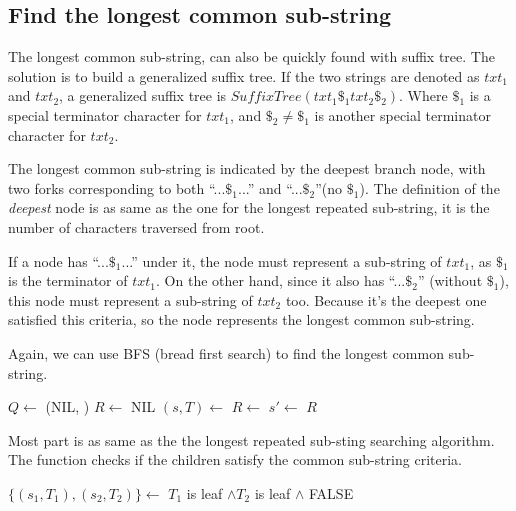 \documentclass{article}
\begin{document}
\subsection{Find the longest common sub-string}

The longest common sub-string, can also be quickly found
with suffix tree. The solution is to build a generalized suffix
tree. If the two strings are denoted as $txt_1$ and
$txt_2$, a generalized suffix tree is $SuffixTree(txt_1\$_1txt_2\$_2)$.
Where $\$_1$ is a special terminator character for $txt_1$, and
$\$_2 \neq \$_1$ is another special terminator character for $txt_2$.

The longest common sub-string is indicated by the deepest branch node, with
two forks corresponding to both ``...$\$_1$...'' and ``...$\$_2$''(no $\$_1$).
The definition of the {\em deepest} node is as same as the one for
the longest repeated sub-string, it is the number of characters traversed
from root.

If a node has ``...$\$_1$...'' under it, the node must represent
a sub-string of $txt_1$, as $\$_1$ is the terminator of $txt_1$.
On the other hand, since it also has ``...$\$_2$'' (without $\$_1$), this node
must represent a sub-string of $txt_2$ too. Because it's the deepest
one satisfied this criteria, so the node represents the longest common
sub-string.

Again, we can use BFS (bread first search) to find the longest common sub-string.

\begin{algorithmic}[1]
  \State $Q \gets$ (NIL, )
  \State $R \gets$ NIL
    \State $(s, T) \gets$ 
      \State $R \gets$ 
    \EndIf
        \State $s' \gets$ 
        \State {}
      \EndIf
    \EndFor
  \EndWhile
  \State \Return $R$
\EndFunction
\end{algorithmic}

Most part is as same as the the longest repeated sub-sting searching algorithm.
The function  checks if the children satisfy the common sub-string criteria.

\begin{algorithmic}[1]
    \State $\{(s_1, T_1), (s_2, T_2)\} \gets$ 
    \State \Return $T_1$ is leaf $\land T_2$ is leaf $\land$ 
  \EndIf
  \State \Return FALSE
\EndFunction
\end{algorithmic}
\end{document}
